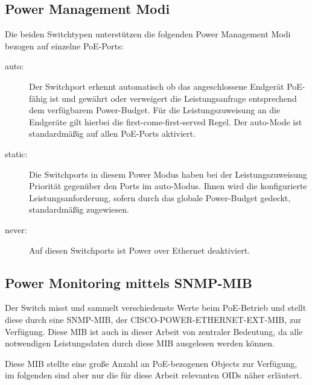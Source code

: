 \subsection{Power Management Modi}
\label{subsec:power-management-modes}
Die beiden Switchtypen unterst\"utzen die folgenden Power Management Modi bezogen auf einzelne PoE-Ports:
\begin{description}
\item [auto:] Der Switchport erkennt automatisch ob das angeschlossene Endger\"at PoE-f\"ahig ist und gew\"ahrt oder verweigert die Leistungsanfrage entsprechend dem verf\"ugbarem Power-Budget. F\"ur die Leistungszuweisung an die Endger\"ate gilt hierbei die first-come-first-served Regel. Der auto-Mode ist standardm\"a{\ss}ig auf allen PoE-Ports aktiviert.
\item [static:] Die Switchports in diesem Power Modus haben bei der Leistungszuweisung Priorit\"at gegen\"uber den Ports im auto-Modus. Ihnen wird die konfigurierte Leistungsanforderung, sofern durch das globale Power-Budget gedeckt, standardm\"a{\ss}ig zugewiesen.
\item [never:] Auf diesen Switchports ist Power over Ethernet deaktiviert. 
\end{description}

\subsection{Power Monitoring mittels SNMP-MIB}
Der Switch misst und sammelt verschiedenste Werte beim PoE-Betrieb und stellt diese durch eine SNMP-MIB, der CISCO-POWER-ETHERNET-EXT-MIB\cite{cisco-poe-ext-mib}, zur Verf\"ugung.
Diese MIB ist auch in dieser Arbeit von zentraler Bedeutung, da alle notwendigen Leistungsdaten durch diese MIB ausgelesen werden k\"onnen.

Diese MIB stellte eine gro{\ss}e Anzahl an PoE-bezogenen Objects zur Verf\"ugung, im folgenden sind aber nur die f\"ur diese Arbeit relevanten OIDs n\"aher erl\"autert.

